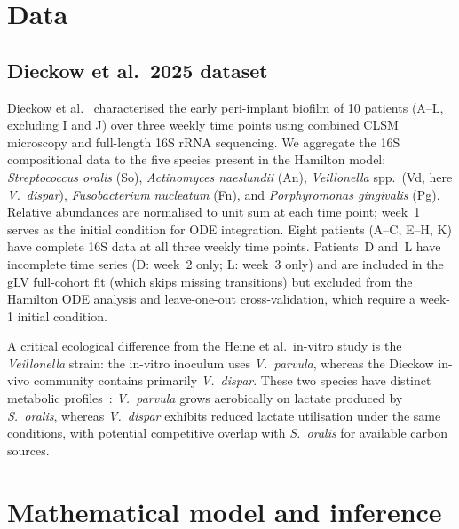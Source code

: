 \documentclass[11pt,a4paper]{article}
\begin{document}
\section{Data}
\label{sec:data}

\subsection{Dieckow et al.\ 2025 dataset}

Dieckow et al.~\cite{Dieckow2025InVivo} characterised the early peri-implant biofilm of 10 patients (A--L, excluding I and J) over three weekly time points using combined CLSM microscopy and full-length 16S rRNA sequencing.
We aggregate the 16S compositional data to the five species present in the Hamilton model: \textit{Streptococcus oralis} (So), \textit{Actinomyces naeslundii} (An), \textit{Veillonella} spp.\ (Vd, here \textit{V.~dispar}), \textit{Fusobacterium nucleatum} (Fn), and \textit{Porphyromonas gingivalis} (Pg).
Relative abundances are normalised to unit sum at each time point; week~1 serves as the initial condition for ODE integration.
Eight patients (A--C, E--H, K) have complete 16S data at all three weekly time points.
Patients~D and~L have incomplete time series (D: week~2 only; L: week~3 only) and are included in the gLV full-cohort fit (which skips missing transitions) but excluded from the Hamilton ODE analysis and leave-one-out cross-validation, which require a week-1 initial condition.

A critical ecological difference from the Heine et al.\ in-vitro study is the \textit{Veillonella} strain: the in-vitro inoculum uses \textit{V.~parvula}, whereas the Dieckow in-vivo community contains primarily \textit{V.~dispar}.
These two species have distinct metabolic profiles~\cite{Rogosa1965Veillonella}: \textit{V.~parvula} grows aerobically on lactate produced by \textit{S.~oralis}, whereas \textit{V.~dispar} exhibits reduced lactate utilisation under the same conditions, with potential competitive overlap with \textit{S.~oralis} for available carbon sources.

\section{Mathematical model and inference}
\label{sec:methods}
\end{document}
